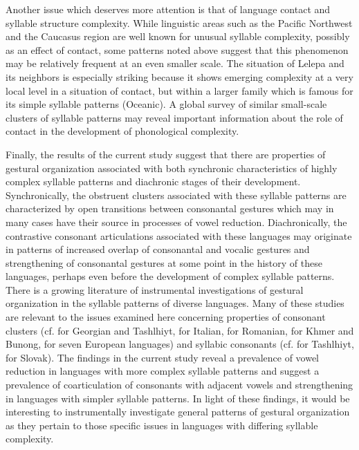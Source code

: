   Another issue which deserves more attention is that of language contact and syllable structure complexity. While linguistic areas such as the Pacific Northwest and the Caucasus region are well known for unusual syllable complexity, possibly as an effect of contact, some patterns noted above suggest that this phenomenon may be relatively frequent at an even smaller scale. The situation of Lelepa and its neighbors is especially striking because it shows emerging complexity at a very local level in a situation of contact, but within a larger family which is famous for its simple syllable patterns (Oceanic). A global survey of similar small-scale clusters of syllable patterns may reveal important information about the role of contact in the development of phonological complexity.

  Finally, the results of the current study suggest that there are properties of gestural organization associated with both synchronic characteristics of highly complex syllable patterns and diachronic stages of their development. Synchronically, the obstruent clusters associated with these syllable patterns are characterized by open transitions between consonantal gestures which may in many cases have their source in processes of vowel reduction. Diachronically, the contrastive consonant articulations associated with these languages may originate in patterns of increased overlap of consonantal and vocalic gestures and strengthening of consonantal gestures at some point in the history of these languages, perhaps even before the development of complex syllable patterns. There is a growing literature of instrumental investigations of gestural organization in the syllable patterns of diverse languages. Many of these studies are relevant to the issues examined here concerning properties of consonant clusters (cf. \citealt{GoldsteinEtAl2007} for Georgian and Tashlhiyt, \citealt{HermesEtAl2013} for Italian, \citealt{Marin2014} for Romanian, \citealt{Butler2015} for Khmer and Bunong, \citealt{MarinEtAl2017} for seven European languages) and syllabic consonants (cf. \citealt{HermesEtAl2011} for Tashlhiyt, \citealt{PouplierBeňuš2011} for Slovak). The findings in the current study reveal a prevalence of vowel reduction in languages with more complex syllable patterns and suggest a prevalence of coarticulation of consonants with adjacent vowels and strengthening in languages with simpler syllable patterns. In light of these findings, it would be interesting to instrumentally investigate general patterns of gestural organization as they pertain to those specific issues in languages with differing syllable complexity.
